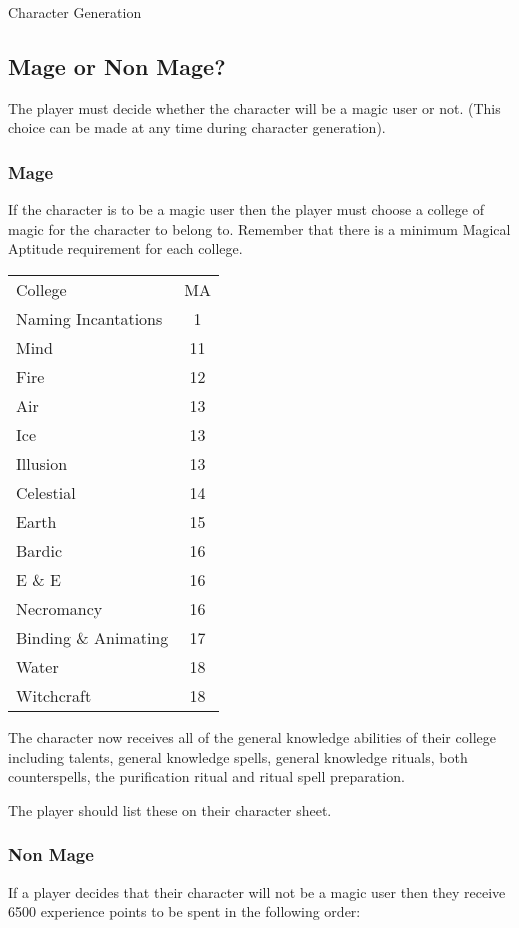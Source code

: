\begin{Chapter}{Character Generation}
\subsection{Mage or Non Mage?}

The player must decide whether the character will be a magic user or
not. (This choice can be made at any time during character
generation).

\subsubsection{Mage}

If the character is to be a magic user then the player must choose a
college of magic for the character to belong to.  Remember that there
is a minimum Magical Aptitude requirement for each college.


\begin{tabularx}{\columnwidth}{Xc}
College			& MA \\
Naming Incantations	& 1 \\
Mind			& 11 \\
Fire			& 12 \\
Air			& 13 \\
Ice			& 13 \\
Illusion		& 13 \\
Celestial		& 14 \\
Earth			& 15 \\
Bardic			& 16 \\
E \& E			& 16 \\
Necromancy		& 16 \\
Binding \& Animating	& 17 \\
Water			& 18 \\
Witchcraft		& 18 \\
\end{tabularx}

The character now receives all of the general knowledge abilities of
their college including talents, general knowledge spells, general
knowledge rituals, both counterspells, the purification ritual and
ritual spell preparation.

The player should list these on their character sheet.

\subsubsection{Non Mage}

If a player decides that their character will not be a magic user then
they receive 6500 experience points to be spent in the following
order:


\end{Chapter}
